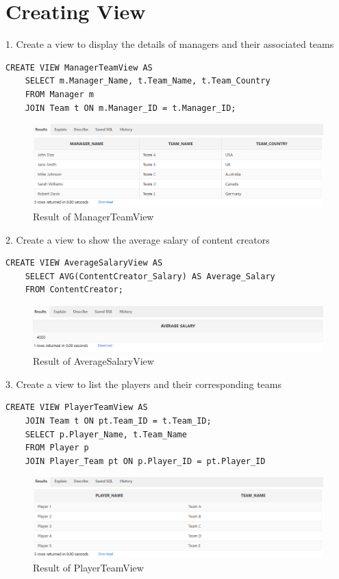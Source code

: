\section{Creating View}
\hrulefill

1. Create a view to display the details of managers and their associated teams
\begin{lstlisting}[caption={ ManagerTeamView },label={lst:V-1}]
    CREATE VIEW ManagerTeamView AS
    SELECT m.Manager_Name, t.Team_Name, t.Team_Country
    FROM Manager m
    JOIN Team t ON m.Manager_ID = t.Manager_ID;
\end{lstlisting}
\begin{figure}[H]
    \centering
    \includegraphics[width=1\textwidth]{images/dml/views/v1.png}
    \caption{Result of ManagerTeamView}
\end{figure}
2. Create a view to show the average salary of content creators

\begin{lstlisting}[caption={ AvgSalaryView },label={lst:V-2}]
    CREATE VIEW AverageSalaryView AS
    SELECT AVG(ContentCreator_Salary) AS Average_Salary
    FROM ContentCreator;
\end{lstlisting}
\begin{figure}[H]
    \centering
    \includegraphics[width=1\textwidth]{images/dml/views/v2.png}
    \caption{Result of AverageSalaryView}
\end{figure}
3. Create a view to list the players and their corresponding teams
\begin{lstlisting}[caption={ PlayerTeamView },label={lst:V-3}]
    CREATE VIEW PlayerTeamView AS
    JOIN Team t ON pt.Team_ID = t.Team_ID;
    SELECT p.Player_Name, t.Team_Name
    FROM Player p
    JOIN Player_Team pt ON p.Player_ID = pt.Player_ID
\end{lstlisting}
\begin{figure}[H]
    \centering
    \includegraphics[width=1\textwidth]{images/dml/views/v3.png}
    \caption{Result of PlayerTeamView}
\end{figure}
